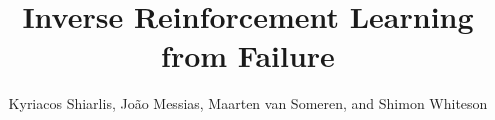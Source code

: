\documentclass[conference]{IEEEtran}
\begin{document}
\title{Inverse Reinforcement Learning from Failure}

\author{Kyriacos Shiarlis, Jo\~{a}o Messias, Maarten van Someren, and Shimon Whiteson}





% 


\maketitle
\end{document}
